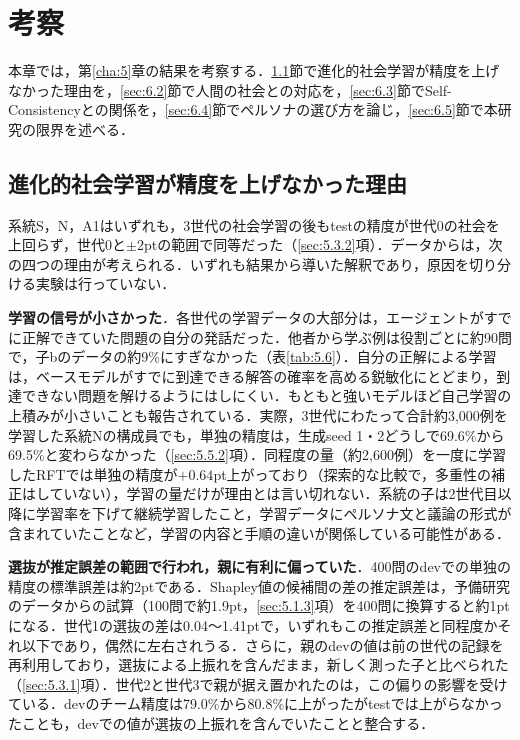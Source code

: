 

\chapter{考察}
\label{cha:6}

本章では，第\ref{cha:5}章の結果を考察する．\ref{sec:6.1}節で進化的社会学習が精度を上げなかった理由を，\ref{sec:6.2}節で人間の社会との対応を，\ref{sec:6.3}節でSelf-Consistencyとの関係を，\ref{sec:6.4}節でペルソナの選び方を論じ，\ref{sec:6.5}節で本研究の限界を述べる．

\section{進化的社会学習が精度を上げなかった理由}
\label{sec:6.1}

系統S，N，A1はいずれも，3世代の社会学習の後もtestの精度が世代0の社会を上回らず，世代0と$\pm 2$ptの範囲で同等だった（\ref{sec:5.3.2}項）．データからは，次の四つの理由が考えられる．いずれも結果から導いた解釈であり，原因を切り分ける実験は行っていない．

\textbf{学習の信号が小さかった}．各世代の学習データの大部分は，エージェントがすでに正解できていた問題の自分の発話だった．他者から学ぶ例は役割ごとに約90問で，子bのデータの約9\%にすぎなかった（表\ref{tab:5.6}）．自分の正解による学習は，ベースモデルがすでに到達できる解答の確率を高める鋭敏化にとどまり，到達できない問題を解けるようにはしにくい\cite{yue2025rlvr}．もともと強いモデルほど自己学習の上積みが小さいことも報告されている\cite{yuan2023scaling}．実際，3世代にわたって合計約3,000例を学習した系統Nの構成員でも，単独の精度は，生成seed 1・2どうしで69.6\%から69.5\%と変わらなかった（\ref{sec:5.5.2}項）．同程度の量（約2,600例）を一度に学習したRFTでは単独の精度が$+0.64$pt上がっており（探索的な比較で，多重性の補正はしていない），学習の量だけが理由とは言い切れない．系統の子は2世代目以降に学習率を下げて継続学習したこと，学習データにペルソナ文と議論の形式が含まれていたことなど，学習の内容と手順の違いが関係している可能性がある．

\textbf{選抜が推定誤差の範囲で行われ，親に有利に偏っていた}．400問のdevでの単独の精度の標準誤差は約2ptである．Shapley値の候補間の差の推定誤差は，予備研究のデータからの試算（100問で約1.9pt，\ref{sec:5.1.3}項）を400問に換算すると約1ptになる．世代1の選抜の差は0.04〜1.41ptで，いずれもこの推定誤差と同程度かそれ以下であり，偶然に左右されうる．さらに，親のdevの値は前の世代の記録を再利用しており，選抜による上振れを含んだまま，新しく測った子と比べられた（\ref{sec:5.3.1}項）．世代2と世代3で親が据え置かれたのは，この偏りの影響を受けている．devのチーム精度は79.0\%から80.8\%に上がったがtestでは上がらなかったことも，devでの値が選抜の上振れを含んでいたことと整合する．

